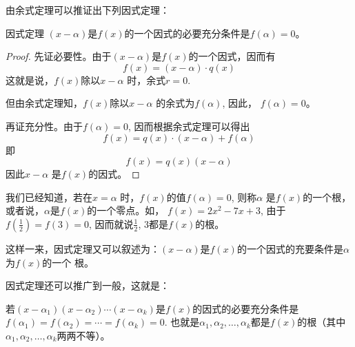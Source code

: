 由余式定理可以推证出下列因式定理：

\begin{blk}{因式定理}
$(x-\alpha)$是$f(x)$的一个因式的必要充分条件是$f (\alpha) =0$。
\end{blk}

\begin{proof}
  先证必要性。由于$(x-\alpha)$是$f(x)$的一个因式，因而有
\[f (x) = (x-\alpha ) \cdot q (x) \]
这就是说，$f(x)$除以$x-\alpha$ 时，余式$r=0$.

但由余式定理知，$f(x)$除以$x-\alpha$ 的余式为$f(\alpha )$, 因此，
$f (\alpha) =0$。

再证充分性。由于$f(\alpha )=0$, 因而根据余式定理可以得出
\[f (x) =q (x) \cdot  (x-\alpha ) +f (\alpha ) \]
即
\[f (x) =q (x) (x-\alpha )\]
因此$x-\alpha$ 是$f(x)$的因式。  
\end{proof}


我们已经知道，若在$x=\alpha$ 时，$f(x)$的值$f(\alpha )=0$, 则称$\alpha$ 是$f(x)$的一个根，或者说，$\alpha$是$f(x)$的一个零点。如，
$f(x)=2x^2-7x+3$, 由于$f\left(\frac{1}{2}\right)=f(3)=0$, 因而就说$\frac{1}{2}$,
3都是$f(x)$的根。

这样一来，因式定理又可以叙述为：$(x-\alpha)$是$f(x)$的一个因式的充要条件是$\alpha$ 为$f(x)$的一个
根。

因式定理还可以推广到一般，这就是：

若$(x-\alpha_1)(x-\alpha_2)\cdots(x-\alpha_k)$是$f(x)$的因式的必要充分条件是$f(\alpha_1)=f(\alpha_2) =\cdots=f(\alpha_k)=0$. 也就是$\alpha_1,\alpha_2,\ldots,\alpha_k$都是$f(x)$的根（其中$\alpha_1,\alpha_2,\ldots,\alpha_k$两两不等）。

